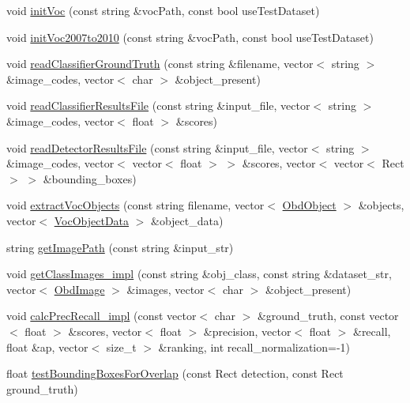 \begin{DoxyCompactItemize}
\item 
void \hyperlink{classVocData_ab71bb7378a0a0356d43492790f9ba187}{init\-Voc} (const string \&voc\-Path, const bool use\-Test\-Dataset)
\item 
void \hyperlink{classVocData_a26b0aee0bfa9621852db92d6fb5de147}{init\-Voc2007to2010} (const string \&voc\-Path, const bool use\-Test\-Dataset)
\item 
void \hyperlink{classVocData_a664471c4279bd2ac2e5bb6a0ef8de9c1}{read\-Classifier\-Ground\-Truth} (const string \&filename, vector$<$ string $>$ \&image\-\_\-codes, vector$<$ char $>$ \&object\-\_\-present)
\item 
void \hyperlink{classVocData_aac2d3f030a95224c8dafde8e2e4b3d06}{read\-Classifier\-Results\-File} (const string \&input\-\_\-file, vector$<$ string $>$ \&image\-\_\-codes, vector$<$ float $>$ \&scores)
\item 
void \hyperlink{classVocData_a4c31fa584e7b47c578d44376e2ef8e86}{read\-Detector\-Results\-File} (const string \&input\-\_\-file, vector$<$ string $>$ \&image\-\_\-codes, vector$<$ vector$<$ float $>$ $>$ \&scores, vector$<$ vector$<$ Rect $>$ $>$ \&bounding\-\_\-boxes)
\item 
void \hyperlink{classVocData_a1a41aa13a88461655386bb1225853df7}{extract\-Voc\-Objects} (const string filename, vector$<$ \hyperlink{classObdObject}{Obd\-Object} $>$ \&objects, vector$<$ \hyperlink{classVocObjectData}{Voc\-Object\-Data} $>$ \&object\-\_\-data)
\item 
string \hyperlink{classVocData_a752e19ab7762411e1e8697cf708b1595}{get\-Image\-Path} (const string \&input\-\_\-str)
\item 
void \hyperlink{classVocData_ae153b6a3a13738cf35b1c264028de279}{get\-Class\-Images\-\_\-impl} (const string \&obj\-\_\-class, const string \&dataset\-\_\-str, vector$<$ \hyperlink{classObdImage}{Obd\-Image} $>$ \&images, vector$<$ char $>$ \&object\-\_\-present)
\item 
void \hyperlink{classVocData_af04f6b1b7d377efb8022416cb7c2452a}{calc\-Prec\-Recall\-\_\-impl} (const vector$<$ char $>$ \&ground\-\_\-truth, const vector$<$ float $>$ \&scores, vector$<$ float $>$ \&precision, vector$<$ float $>$ \&recall, float \&ap, vector$<$ size\-\_\-t $>$ \&ranking, int recall\-\_\-normalization=-\/1)
\item 
float \hyperlink{classVocData_a1cbbaf80dd0d3180a94868c1bdc5b3b5}{test\-Bounding\-Boxes\-For\-Overlap} (const Rect detection, const Rect ground\-\_\-truth)

\end{DoxyCompactItemize}
